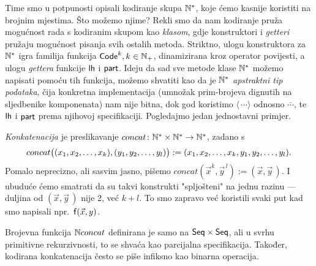 Time smo u potpunosti opisali kodiranje skupa ${\mathbb N}^*$, koje ćemo kasnije koristiti na brojnim mjestima. Što možemo njime? Rekli smo da nam kodiranje pruža mogućnost rada s kodiranim skupom kao \emph{klasom}, gdje konstruktori i \emph{getteri} pružaju mogućnost pisanja svih ostalih metoda. Striktno, ulogu konstruktora za ${\mathbb N}^*$ igra familija funkcija $\mathsf{Code}^k,k\in{\mathbb N}_+$, dinamizirana kroz operator povijesti, a ulogu \emph{gettera} funkcije $\mathsf{lh}$ i $\mathsf{part}$. Ideju da sad sve metode klase ${\mathbb N}^*$ možemo napisati pomoću tih funkcija, možemo shvatiti kao da je ${\mathbb N}^*$ \emph{apstraktni tip podataka}, čija konkretna implementacija (umnožak prim-brojeva dignutih na sljedbenike komponenata) nam nije bitna, dok god koristimo $\langle\,\cdots\rangle$ odnosno $\overline{\cdots}$, te $\mathsf{lh}$ i $\mathsf{part}$ prema njihovoj specifikaciji. Pogledajmo jedan jednostavni primjer.

\begin{primjer}\label{pr:concat}
\emph{Konkatenacija} je preslikavanje  $concat\colon{\mathbb N}^*\times{\mathbb N}^*\to{\mathbb N}^*$, zadano s
\begin{equation}
    concat\bigl((x_1,x_2,\dotsc,x_k),(y_1,y_2,\dotsc,y_l)\bigr):=(x_1,x_2,\dotsc,x_k,y_1,y_2,\dotsc,y_l)\text.
\end{equation}
Pomalo neprecizno, ali sasvim jasno, pišemo $concat(\vec x^k,\vec y^{\,l}):=(\vec x,\vec y\,)$. I ubuduće ćemo smatrati da su takvi konstrukti "spljošteni" na jednu razinu --- duljina od $(\vec x,\vec y\,)$ nije $2$, već $k+l$. To smo zapravo već koristili svaki put kad smo napisali npr.\ $\mathsf{f}(\vec x,y)$.
\end{primjer}

Brojevna funkcija ${\mathbb N} concat$ definirana je samo na $\mathsf{Seq}\times\mathsf{Seq}$, ali u svrhu primitivne rekurzivnosti, to se shvaća kao parcijalna specifikacija. Također, kodirana konkatenacija često se piše infiksno kao binarna operacija.

